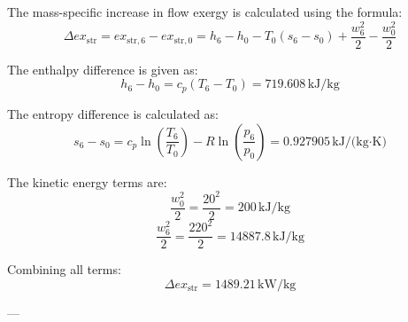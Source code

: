 The mass-specific increase in flow exergy is calculated using the formula:  
\[
\Delta ex_{\text{str}} = ex_{\text{str},6} - ex_{\text{str},0} = h_6 - h_0 - T_0 (s_6 - s_0) + \frac{w_6^2}{2} - \frac{w_0^2}{2}
\]  

The enthalpy difference is given as:  
\[
h_6 - h_0 = c_p (T_6 - T_0) = 719.608 \, \text{kJ/kg}
\]  

The entropy difference is calculated as:  
\[
s_6 - s_0 = c_p \ln \left( \frac{T_6}{T_0} \right) - R \ln \left( \frac{p_6}{p_0} \right) = 0.927905 \, \text{kJ/(kg·K)}
\]  

The kinetic energy terms are:  
\[
\frac{w_0^2}{2} = \frac{20^2}{2} = 200 \, \text{kJ/kg}
\]  
\[
\frac{w_6^2}{2} = \frac{220^2}{2} = 14887.8 \, \text{kJ/kg}
\]  

Combining all terms:  
\[
\Delta ex_{\text{str}} = 1489.21 \, \text{kW/kg}
\]  

---